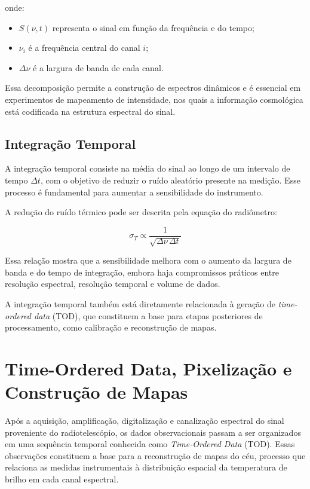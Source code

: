 onde:
\begin{itemize}
    \item $S(\nu, t)$ representa o sinal em função da frequência e do tempo;
    \item $\nu_i$ é a frequência central do canal $i$;
    \item $\Delta \nu$ é a largura de banda de cada canal.
\end{itemize}

Essa decomposição permite a construção de espectros dinâmicos e é essencial em experimentos de mapeamento de intensidade, nos quais a informação cosmológica está codificada na estrutura espectral do sinal.

\subsection{Integração Temporal}

A integração temporal consiste na média do sinal ao longo de um intervalo de tempo $\Delta t$, com o objetivo de reduzir o ruído aleatório presente na medição. Esse processo é fundamental para aumentar a sensibilidade do instrumento.

A redução do ruído térmico pode ser descrita pela equação do radiômetro:

\begin{equation}
    \sigma_T \propto \frac{1}{\sqrt{\Delta \nu \, \Delta t}}
\end{equation}

Essa relação mostra que a sensibilidade melhora com o aumento da largura de banda e do tempo de integração, embora haja compromissos práticos entre resolução espectral, resolução temporal e volume de dados.

A integração temporal também está diretamente relacionada à geração de \textit{time-ordered data} (TOD), que constituem a base para etapas posteriores de processamento, como calibração e reconstrução de mapas.


\section{Time-Ordered Data, Pixelização e Construção de Mapas}

Após a aquisição, amplificação, digitalização e canalização espectral do sinal proveniente do radiotelescópio, os dados observacionais passam a ser organizados em uma sequência temporal conhecida como \textit{Time-Ordered Data} (TOD). Essas observações constituem a base para a reconstrução de mapas do céu, processo que relaciona as medidas instrumentais à distribuição espacial da temperatura de brilho em cada canal espectral.

